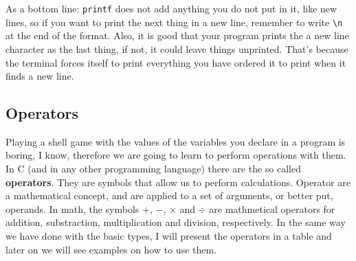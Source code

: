 \documentclass[a4paper]{article}
\begin{document}
As a bottom line: \texttt{printf} does not add anything you do not put in it,
like new lines, so if you want to print the next thing in a new line, remember
to write \verb!\n! at the end of the format. Also, it is good that your program
prints the a new line character as the last thing, if not, it could leave things
unprinted. That's because the terminal forces itself to print everything you
have ordered it to print when it finds a new line.

\subsection{Operators}

Playing a shell game with the values of the variables you declare in a program
is boring, I know, therefore we are going to learn to perform operations with
them. In C (and in any other programming language) there are the so called
\textbf{operators}. They are symbols that allow us to perform calculations.
Operator are a mathematical concept, and are applied to a set of arguments, or
better put, operands. In math, the symbols $+$, $-$, $\times$ and $\div$ are
mathmetical operators for addition, substraction, multiplication and division,
respectively. In the same way we have done with the basic types, I will present
the operators in a table and later on we will see examples on how to use them.
\end{document}
